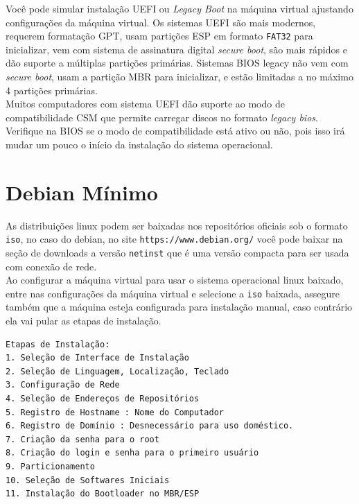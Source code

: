 \documentclass[12pt,a4paper]{article}
\begin{document}
Você pode simular instalação UEFI ou \textit{Legacy Boot} na máquina virtual ajustando configurações da máquina virtual. Os sistemas UEFI são mais modernos, requerem formatação GPT, usam partições ESP em formato \texttt{FAT32} para inicializar, vem com sistema de assinatura digital \textit{secure boot}, são mais rápidos e dão suporte a múltiplas partições primárias. Sistemas BIOS legacy não vem com \textit{secure boot}, usam a partição MBR para inicializar, e estão limitadas a no máximo 4 partições primárias.\\

Muitos computadores com sistema UEFI dão suporte ao modo de compatibilidade CSM que permite carregar discos no formato \textit{legacy bios}. Verifique na BIOS se o modo de compatibilidade está ativo ou não, pois isso irá mudar um pouco o início da instalação do sistema operacional. \\

\section*{Debian Mínimo} 

\hspace{\baselineskip}

As distribuições linux podem ser baixadas nos repositórios oficiais sob o formato \texttt{iso}, no caso do debian, no site \texttt{https://www.debian.org/} você pode baixar na seção de downloads a versão \texttt{netinst} que é uma versão compacta para ser usada com conexão de rede. \\

Ao configurar a máquina virtual para usar o sistema operacional linux baixado, entre nas configurações da máquina virtual e selecione a \texttt{iso} baixada, assegure também que a máquina esteja configurada para instalação manual, caso contrário ela vai pular as etapas de instalação. \\

\begin{lstlisting}
Etapas de Instalação:
1. Seleção de Interface de Instalação
2. Seleção de Linguagem, Localização, Teclado
3. Configuração de Rede 
4. Seleção de Endereços de Repositórios
5. Registro de Hostname : Nome do Computador 
6. Registro de Domínio : Desnecessário para uso doméstico. 
7. Criação da senha para o root 
8. Criação do login e senha para o primeiro usuário 
9. Particionamento 
10. Seleção de Softwares Iniciais 
11. Instalação do Bootloader no MBR/ESP 
\end{lstlisting}
\end{document}
